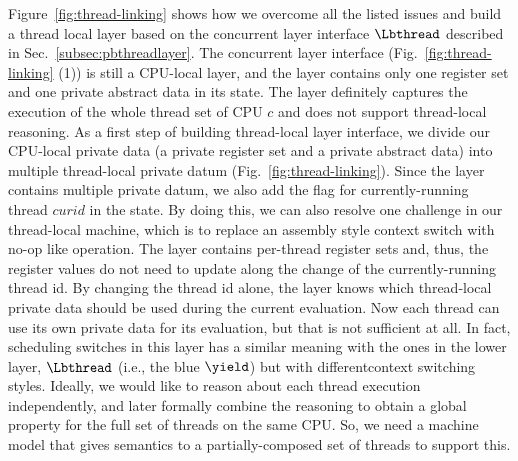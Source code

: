 Figure~\ref{fig:thread-linking} shows how we overcome all the listed issues and build a thread local layer based on the 
 concurrent layer interface $\Lbthread$ described in Sec.~\ref{subsec:pbthreadlayer}.
The concurrent layer interface (\cf Fig.~\ref{fig:thread-linking} (1)) is still a CPU-local layer,
and the layer contains only one register set and one private abstract data in its state.
The layer definitely captures the execution of the whole thread set of CPU $c$ 
and does not support thread-local reasoning.
As a first step of building thread-local layer interface, 
we divide our CPU-local private data (a private register set and a private abstract data) into multiple thread-local
private datum (Fig.~\ref{fig:thread-linking}). 
Since the layer contains multiple private datum, we also add the flag for currently-running thread $curid$ in the state. 
By doing this, we can also resolve one challenge in our thread-local machine, which is to replace an assembly style 
context switch with no-op like operation. 
The layer contains per-thread register sets and, thus, the register values do not need to update along the change of the currently-running thread id. By changing the thread id alone, the layer knows which thread-local private data should be 
used during the current evaluation.
Now each thread can use its own private data for its evaluation, but that is not sufficient at all. 
In fact, scheduling switches in this layer has a similar meaning with the ones in the lower layer, 
$\Lbthread$ (i.e., the blue $\yield$) but with differentcontext switching styles.
Ideally, we would like to reason about each thread execution 
independently, and later formally combine the reasoning to obtain a global
property for the full set of threads on the same CPU.
So, we need a machine model that gives semantics to
a partially-composed set of threads to support this.

